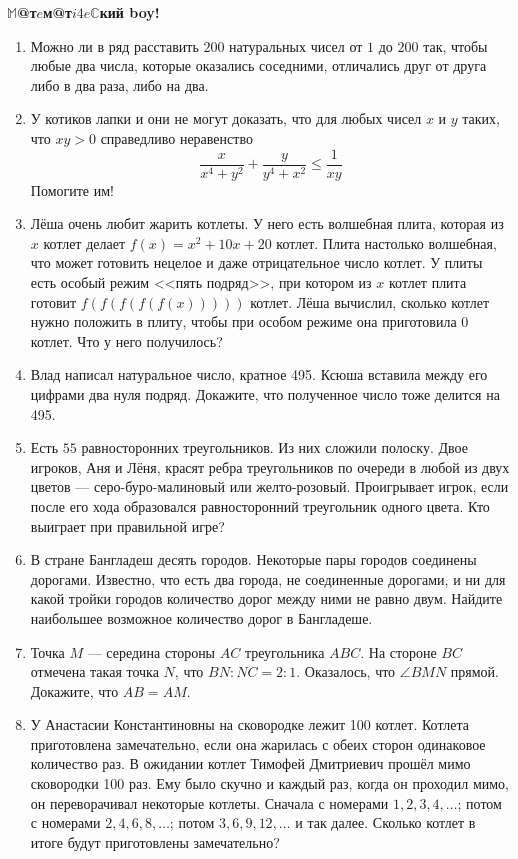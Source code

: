 \documentclass{article}
\begin{document}
\large


\begin{center}
	\textbf{$\mathbb{M}$@т$e$м@т$i4e\mathbb{C}$кий boy!}
\end{center}

\begin{enumerate}


\item Можно ли в ряд расставить $200$ натуральных чисел от $1$ до $200$ так, чтобы любые два числа, которые оказались соседними, отличались друг от друга либо в два раза, либо на два. 
\item  У котиков лапки и они не могут доказать, что для любых чисел $x$ и $y$ таких, что $xy > 0$ справедливо неравенство
$$\frac{x}{x^4 + y^2} + \frac{y}{y^4 + x^2} \leqslant \frac{1}{xy}$$
Помогите им!

\item Лёша очень любит жарить котлеты. У него есть волшебная плита, которая из $x$ котлет делает $f(x) =  x^2 + 10x + 20$ котлет. Плита настолько волшебная, что может готовить нецелое и даже отрицательное число котлет. У плиты есть особый режим <<пять подряд>>, при котором из $x$ котлет плита готовит $f(f(f(f(f(x)))))$ котлет. Лёша вычислил, сколько котлет нужно положить в плиту, чтобы при особом режиме она приготовила 0 котлет. Что у него получилось?

\item Влад написал натуральное число, кратное 495. Ксюша вставила между его цифрами два нуля подряд. Докажите, что полученное число тоже делится на 495.


\item  Есть $55$ равносторонних треугольников. Из них сложили полоску. Двое игроков, Аня и Лёня, красят ребра треугольников по очереди в любой из двух цветов --- серо-буро-малиновый или желто-розовый. Проигрывает игрок, если после его хода образовался равносторонний треугольник одного цвета. Кто выиграет при правильной игре? 

\item В стране Бангладеш десять городов. Некоторые пары городов соединены дорогами.
Известно, что есть два города, не соединенные дорогами, и ни для какой тройки городов количество дорог между ними не равно двум. Найдите наибольшее возможное количество дорог в Бангладеше.

\item Точка $M$ --- середина стороны $AC$ треугольника $ABC$. На стороне $BC$ отмечена такая точка $N$, что $BN:NC = 2:1$. Оказалось, что  $\angle BMN$ прямой. Докажите, что $AB = AM$.

\item У Анастасии Константиновны на сковородке лежит 100 котлет. Котлета приготовлена замечательно, если она жарилась с обеих сторон одинаковое количество раз. В ожидании котлет Тимофей Дмитриевич прошёл мимо сковородки 100 раз. Ему было скучно и каждый раз, когда он проходил мимо, он переворачивал некоторые котлеты. Сначала с номерами $1,2,3,4,\dotsc$; потом с номерами $2,4,6,8,\dotsc$; потом $3,6,9,12,\dotsc$ и так далее. Сколько котлет в итоге будут приготовлены замечательно?






\end{enumerate}
\end{document}
